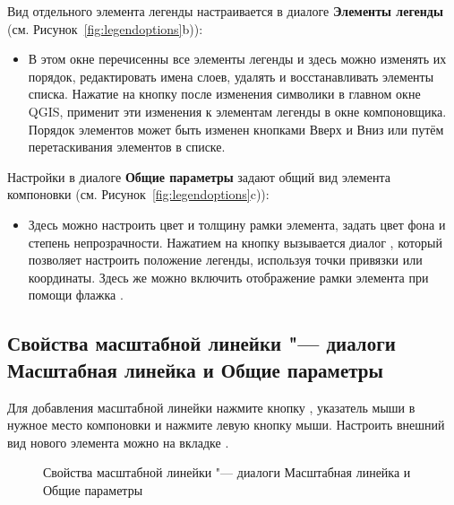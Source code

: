 
Вид отдельного элемента легенды настраивается в диалоге
\textbf{Элементы легенды} (см. Рисунок~\ref{fig:legendoptions}b)):

\begin{itemize}[label=--]
\item В этом окне перечисенны все элементы легенды и здесь можно
изменять их порядок, редактировать имена слоев, удалять и восстанавливать
элементы списка. Нажатие на кнопку  после изменения
символики в главном окне QGIS, применит эти изменения к элементам
легенды в окне компоновщика. Порядок элементов может быть изменен
кнопками Вверх и Вниз или путём перетаскивания элементов в списке.
\end{itemize}


Настройки в диалоге \textbf{Общие параметры} задают общий вид
элемента компоновки (см. Рисунок~\ref{fig:legendoptions}c)):

\begin{itemize}[label=--]
\item Здесь можно настроить цвет и толщину рамки элемента, задать
цвет фона и степень непрозрачности. Нажатием на кнопку
 вызывается диалог ,
который позволяет настроить положение легенды, используя точки привязки
или координаты. Здесь же можно включить отображение рамки элемента при
помощи флажка .
\end{itemize}

\subsection{Свойства масштабной линейки "--- диалоги Масштабная линейка и Общие параметры}

Для добавления масштабной линейки нажмите кнопку
, указатель
мыши в нужное место компоновки и нажмите левую кнопку мыши. Настроить
внешний вид нового элемента можно на вкладке .

\begin{figure}[ht]
\centering
{}
\hspace{1cm}
\caption{Свойства масштабной линейки "--- диалоги Масштабная линейка и Общие параметры \nixcaption}\label{fig:scalebaroptions}
\end{figure}

